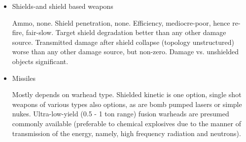 \begin{itemize}
\item Shields-and shield based weapons

Ammo, none. Shield penetration, none. Efficiency, mediocre-poor, hence
re-fire, fair-slow. Target shield degradation better than any other
damage source. Transmitted damage after shield collapse (topology
unstructured) worse than any other damage source, but non-zero. Damage
vs. unshielded objects significant.

\item Missiles

Mostly depends on warhead type. Shielded kinetic is one option, single
shot weapons of various types also options, as are bomb pumped lasers
or simple nukes. Ultra-low-yield (0.5 - 1 ton range) fusion warheads
are presumed commonly available (preferable to chemical explosives due
to the manner of transmission of the energy, namely, high frequency
radiation and neutrons).
\end{itemize}

